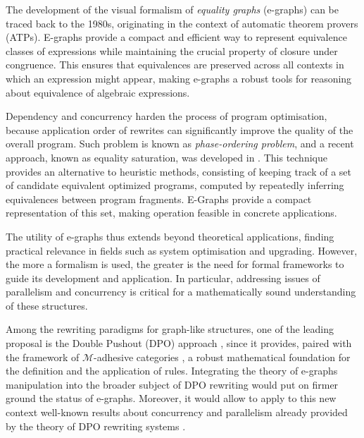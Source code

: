 The development of the visual formalism of \emph{equality graphs} (e-graphs) can be traced back to the 1980s, originating in the context of automatic theorem provers (ATPs). E-graphs provide a compact and efficient way to represent equivalence classes of expressions while maintaining the crucial property of closure under congruence. This ensures that equivalences are preserved across all contexts in which an expression might appear, making e-graphs a robust tools for reasoning about equivalence of algebraic expressions.

Dependency and concurrency harden the process of program optimisation, because application order of rewrites can significantly improve the quality of the overall program.
Such problem is known as \textit{phase-ordering problem}, and a recent approach, known as equality saturation, was developed in \cite{Tate_2011}.
This technique provides an alternative to heuristic methods, consisting of keeping track of a set of candidate equivalent optimized programs, 
computed by repeatedly inferring equivalences between program fragments.
E-Graphs provide a compact representation of this set, making operation feasible in concrete applications.

The utility of e-graphs thus extends beyond theoretical applications, finding practical relevance in fields such as system optimisation and upgrading.
%
However, the more a formalism is used, the greater is the need for formal frameworks to guide its development and application. In particular, addressing issues of parallelism and concurrency is critical for 
a mathematically 
sound understanding of these structures.

Among the rewriting paradigms for graph-like structures, one of the leading proposal is the Double Pushout (DPO) approach \cite{Ehrig_Golas,ehrig2006fundamentals}, since it provides, paired with the framework of $\mathcal{M}$-adhesive  categories \cite{lack2005adhesive,azzi2019essence,behr2022fundamentals}, a robust mathematical foundation for the definition and the application of rules. 
%
Integrating the theory of e-graphs manipulation into the broader subject of DPO rewriting would put on firmer ground the status of e-graphs. Moreover, it would allow to apply to this new context well-known results about concurrency and parallelism already provided by the theory of DPO rewriting systems \cite{baldan1999concurrent,ehrig1999handbook}. 
 
